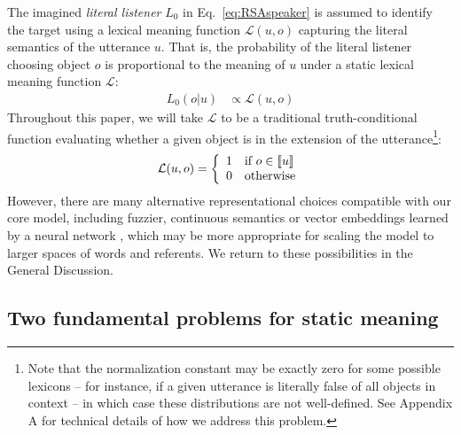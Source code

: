 The imagined \emph{literal listener} $L_0$ in Eq.~\ref{eq:RSAspeaker} is assumed to identify the target using a lexical meaning function $\mathcal{L}(u,o)$ capturing the literal semantics of the utterance $u$.
That is, the probability of the literal listener choosing object $o$ is proportional to the meaning of $u$ under a static lexical meaning function $\mathcal{L}$:
\begin{align}
L_0(o | u) &\propto  \mathcal{L}(u,o)\nonumber
\end{align}
Throughout this paper, we will take $\mathcal{L}$ to be a traditional truth-conditional function evaluating whether a given object is in the extension of the utterance\footnote{Note that the normalization constant may be exactly zero for some possible lexicons -- for instance, if a given utterance is literally false of all objects in context -- in which case these distributions are not well-defined. See Appendix A for technical details of how we address this problem.}:
$$
\mathcal{L}(u,o) = \left\{ \begin{array} {rl} 1 & \textrm{if $o \in \llbracket u \rrbracket$} \\ 0 & \textrm{otherwise} \end{array}\right.
$$
However, there are many alternative representational choices compatible with our core model, including fuzzier, continuous semantics \cite{degen2020redundancy} or vector embeddings learned by a neural network \cite[see Appendix B for examples]{potts2019case}, which may be more appropriate for scaling the model to larger spaces of words and referents.
We return to these possibilities in the General Discussion.


\subsection{Two fundamental problems for static meaning}

